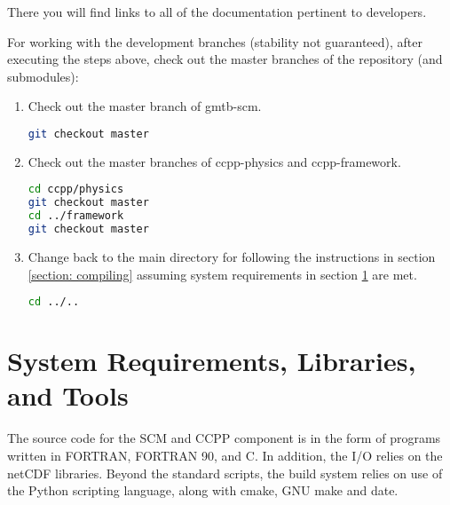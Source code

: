 There you will find links to all of the documentation pertinent to developers.

For working with the development branches (stability not guaranteed), after executing the steps above, check out the master branches of the repository (and submodules):
\begin{enumerate}
    \item Check out the master branch of gmtb-scm.
\begin{lstlisting}[language=bash]
git checkout master
\end{lstlisting}
\item Check out the master branches of ccpp-physics and ccpp-framework.
\begin{lstlisting}[language=bash]
cd ccpp/physics
git checkout master
cd ../framework
git checkout master
\end{lstlisting}
\item Change back to the main directory for following the instructions in section \ref{section: compiling} assuming system requirements in section \ref{section: systemrequirements} are met.
\begin{lstlisting}[language=bash]
cd ../..
\end{lstlisting}
\end{enumerate}


\section{System Requirements, Libraries, and Tools}
\label{section: systemrequirements}

The source code for the SCM and CCPP component is in the form of programs written in FORTRAN, FORTRAN 90, and C. In addition, the I/O relies on the netCDF libraries. Beyond the standard scripts, the build system relies on use of the Python scripting language, along with cmake, GNU make and date.

